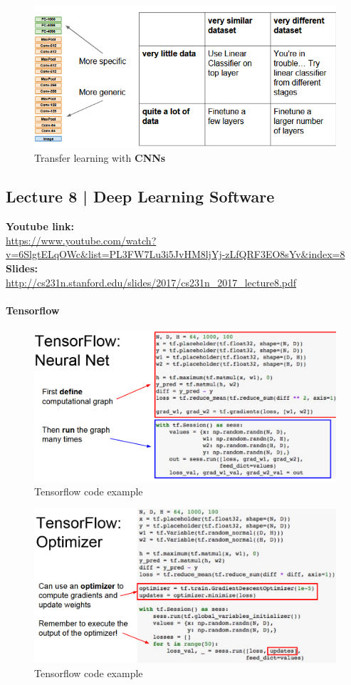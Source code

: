 \documentclass[11pt]{article}
\begin{document}
\begin{figure}[h]
\centering
\captionsetup{justification=centering}
\includegraphics[width=0.7\linewidth]{L627.pdf}
\caption{ Transfer learning with \textbf{CNNs}}
\label{fig:L627}
\end{figure}

\clearpage
\subsection{Lecture 8 | Deep Learning Software}
\textbf{Youtube link:}\\
\url{https://www.youtube.com/watch?v=6SlgtELqOWc&list=PL3FW7Lu3i5JvHM8ljYj-zLfQRF3EO8sYv&index=8}\\
\textbf{Slides:}\\
\url{http://cs231n.stanford.edu/slides/2017/cs231n_2017_lecture8.pdf}
\paragraph{Tensorflow}

\begin{figure}[h]
\centering
\captionsetup{justification=centering}
\includegraphics[width=0.9\linewidth]{L710.pdf}
\caption{ Tensorflow code example}
\label{fig:L710}
\end{figure}

\begin{figure}[h]
\centering
\captionsetup{justification=centering}
\includegraphics[width=0.9\linewidth]{L711.pdf}
\caption{ Tensorflow code example}
\label{fig:L711}
\end{figure}
\clearpage
\end{document}
